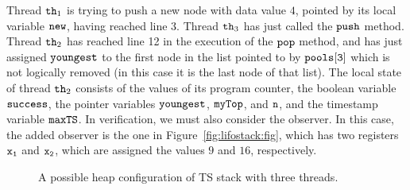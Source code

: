 Thread ${\tt th}_1$ is trying to push a new node with data value $4$, pointed by its local variable $\tt new$, having reached line 3.
Thread ${\tt th}_3$ has just called the ${\tt push}$ method.
Thread ${\tt th}_2$ has reached line 12 in the execution of the ${\tt pop}$ method,  and has just assigned ${\tt youngest}$ to the first node in the list
pointed to by $\tt pools[3]$ which is not logically removed (in this case it is the last node of that list).
The local state of thread ${\tt th}_2$
consists of the values of its program counter, the boolean variable ${\tt success}$, the pointer variables ${\tt youngest}$, ${\tt myTop}$, and ${\tt n}$,
and the timestamp variable ${\tt maxTS}$.
In verification, we must also consider the observer. In this case, the added
observer is the one in Figure~\ref{fig:lifostack:fig}, which has two registers
$\tt x_1$ and $\tt x_2$, which are assigned the values $9$ and $16$,
respectively.

\begin{figure}
	
\caption{A possible heap configuration of TS stack with three threads.}
\label{fig:tsshape}
\end{figure} 
%	


